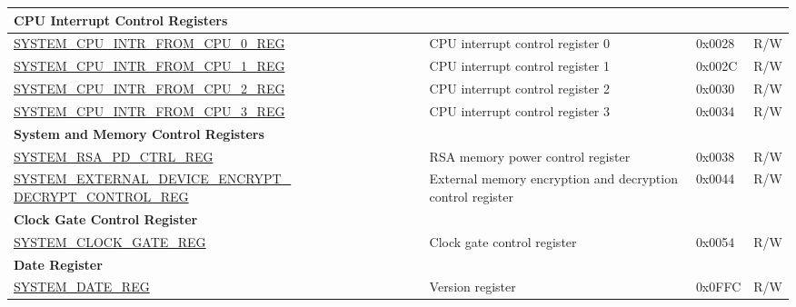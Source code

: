 \begin{longtable}{ | p{6.5cm} | p{6.5cm} | p{1.3cm} | p{1cm} | }
\multicolumn{4}{|l|}{\textbf{CPU Interrupt Control Registers}} \\ \hline
\hyperref[regdesc:SYSTEMCPUINTRFROMCPU0REG]{SYSTEM\_CPU\_INTR\_FROM\_CPU\_0\_REG} & CPU interrupt control register 0 & 0x0028 & R/W \\ \hline
\hyperref[regdesc:SYSTEMCPUINTRFROMCPU1REG]{SYSTEM\_CPU\_INTR\_FROM\_CPU\_1\_REG} & CPU interrupt control register 1 & 0x002C & R/W \\ \hline
\hyperref[regdesc:SYSTEMCPUINTRFROMCPU2REG]{SYSTEM\_CPU\_INTR\_FROM\_CPU\_2\_REG} & CPU interrupt control register 2 & 0x0030 & R/W \\ \hline
\hyperref[regdesc:SYSTEMCPUINTRFROMCPU3REG]{SYSTEM\_CPU\_INTR\_FROM\_CPU\_3\_REG} & CPU interrupt control register 3 & 0x0034 & R/W \\ \hline
\multicolumn{4}{|l|}{\textbf{System and Memory Control Registers}} \\ \hline
\hyperref[regdesc:SYSTEMRSAPDCTRLREG]{SYSTEM\_RSA\_PD\_CTRL\_REG} & RSA memory power control register & 0x0038 & R/W \\ \hline
\hyperref[regdesc:SYSTEMEXTERNALDEVICEENCRYPTDECRYPTCONTROLREG]{SYSTEM\_EXTERNAL\_DEVICE\_ENCRYPT\_} \hyperref[regdesc:SYSTEMEXTERNALDEVICEENCRYPTDECRYPTCONTROLREG]{DECRYPT\_CONTROL\_REG} & External memory encryption and decryption control register & 0x0044 & R/W \\ \hline
\multicolumn{4}{|l|}{\textbf{Clock Gate Control Register}} \\ \hline
\hyperref[regdesc:SYSTEMCLOCKGATEREG]{SYSTEM\_CLOCK\_GATE\_REG} & Clock gate control register & 0x0054 & R/W \\ \hline
\multicolumn{4}{|l|}{\textbf{Date Register}} \\ \hline
\hyperref[regdesc:SYSTEMDATEREG]{SYSTEM\_DATE\_REG} & Version register & 0x0FFC & R/W \\ \hline
\end{longtable}
